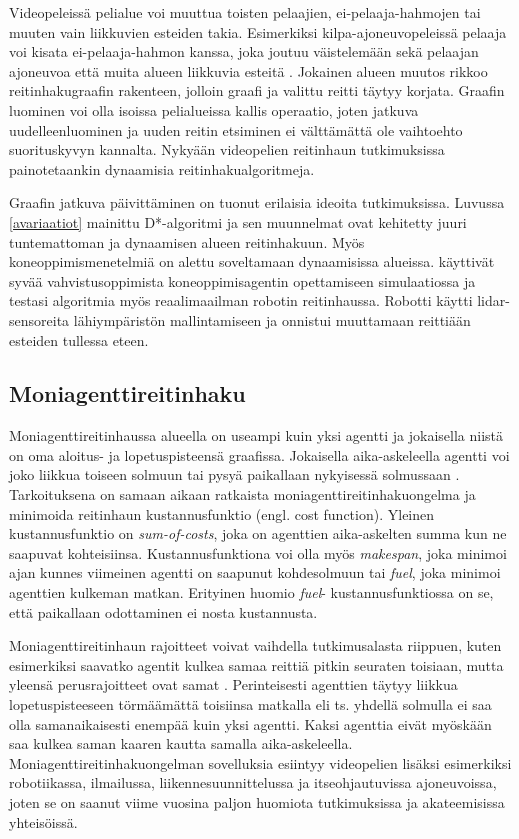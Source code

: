 \documentclass[utf8]{gradu3}
\begin{document}
Videopeleissä pelialue voi muuttua toisten pelaajien, ei-pelaaja-hahmojen tai muuten vain liikkuvien esteiden takia. Esimerkiksi kilpa-ajoneuvopeleissä pelaaja voi kisata ei-pelaaja-hahmon kanssa, joka joutuu väistelemään sekä pelaajan ajoneuvoa että muita alueen liikkuvia esteitä \parencite{sazaki2017pathfinding}. Jokainen alueen muutos rikkoo reitinhakugraafin rakenteen, jolloin graafi ja valittu reitti täytyy korjata. Graafin luominen voi olla isoissa pelialueissa kallis operaatio, joten jatkuva uudelleenluominen ja uuden reitin etsiminen ei välttämättä ole vaihtoehto suorituskyvyn kannalta. Nykyään videopelien reitinhaun tutkimuksissa painotetaankin dynaamisia reitinhakualgoritmeja.

Graafin jatkuva päivittäminen on tuonut erilaisia ideoita tutkimuksissa. Luvussa \ref{avariaatiot} mainittu D*-algoritmi ja sen muunnelmat ovat kehitetty juuri tuntemattoman ja dynaamisen alueen reitinhakuun. Myös koneoppimismenetelmiä on alettu soveltamaan dynaamisissa alueissa. \textcite{lei2018dynamic} käyttivät syvää vahvistusoppimista koneoppimisagentin opettamiseen simulaatiossa ja testasi algoritmia myös reaalimaailman robotin reitinhaussa. Robotti käytti lidar-sensoreita lähiympäristön mallintamiseen ja onnistui muuttamaan reittiään esteiden tullessa eteen.

\subsection{Moniagenttireitinhaku}

Moniagenttireitinhaussa alueella on useampi kuin yksi agentti ja jokaisella niistä on oma aloitus- ja lopetuspisteensä graafissa. Jokaisella aika-askeleella agentti voi joko liikkua toiseen solmuun tai pysyä paikallaan nykyisessä solmussaan \parencite{sharon2015conflict,stern2019multi}. Tarkoituksena on samaan aikaan ratkaista moniagenttireitinhakuongelma ja minimoida reitinhaun kustannusfunktio (engl. cost function). Yleinen kustannusfunktio on \textit{sum-of-costs}, joka on agenttien aika-askelten summa kun ne saapuvat kohteisiinsa. Kustannusfunktiona voi olla myös \textit{makespan}, joka minimoi ajan kunnes viimeinen agentti on saapunut kohdesolmuun tai \textit{fuel}, joka minimoi agenttien kulkeman matkan. Erityinen huomio \textit{fuel}- kustannusfunktiossa on se, että paikallaan odottaminen ei nosta kustannusta.

Moniagenttireitinhaun rajoitteet voivat vaihdella tutkimusalasta riippuen, kuten esimerkiksi saavatko agentit kulkea samaa reittiä pitkin seuraten toisiaan, mutta yleensä perusrajoitteet ovat samat \parencite{sharon2015conflict,stern2019multi}. Perinteisesti agenttien täytyy liikkua lopetuspisteeseen törmäämättä toisiinsa matkalla eli ts. yhdellä solmulla ei saa olla samanaikaisesti enempää kuin yksi agentti. Kaksi agenttia eivät myöskään saa kulkea saman kaaren kautta samalla aika-askeleella. Moniagenttireitinhakuongelman sovelluksia esiintyy videopelien lisäksi esimerkiksi robotiikassa, ilmailussa, liikennesuunnittelussa ja itseohjautuvissa ajoneuvoissa, joten se on saanut viime vuosina paljon huomiota tutkimuksissa ja akateemisissa yhteisöissä.
\end{document}
